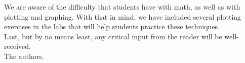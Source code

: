 \documentclass[main.tex]{subfiles}
\begin{document}
\begin{fullwidth}
\begin{multicols*}{2}
We are aware of the difficulty that students have with math, as well as with plotting and graphing. With that in mind, we have included several plotting exercises in the labs that will help students practice these techniques. \\
Last, but by no means least,  any critical input from the reader will be well-received.\\
The authors.\\
 
\end{multicols*}
\clearpage\thispagestyle{empty}\mbox{}\clearpage

\end{fullwidth}
\restoregeometry
{}
\end{document}
